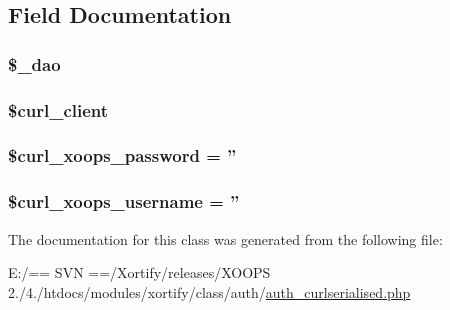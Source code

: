 \subsection{Field Documentation}
\hypertarget{class_xortify_auth_curlserialised_a12a029c610f699b4b25e79a1f64a3485}{
\subsubsection[{\$\-\_\-dao}]{\setlength{\rightskip}{0pt plus 5cm}\$\-\_\-dao}}\label{class_xortify_auth_curlserialised_a12a029c610f699b4b25e79a1f64a3485}
\hypertarget{class_xortify_auth_curlserialised_a402f2112991f3227835af80e9df33e38}{
\subsubsection[{\$curl\-\_\-client}]{\setlength{\rightskip}{0pt plus 5cm}\$curl\-\_\-client}}\label{class_xortify_auth_curlserialised_a402f2112991f3227835af80e9df33e38}
\hypertarget{class_xortify_auth_curlserialised_a6c9851541ed3826c67cfe7224c38f0b8}{
\subsubsection[{\$curl\-\_\-xoops\-\_\-password}]{\setlength{\rightskip}{0pt plus 5cm}\$curl\-\_\-xoops\-\_\-password = ''}}\label{class_xortify_auth_curlserialised_a6c9851541ed3826c67cfe7224c38f0b8}
\hypertarget{class_xortify_auth_curlserialised_aab7480ba9f878a02b2c9fd43922fa070}{
\subsubsection[{\$curl\-\_\-xoops\-\_\-username}]{\setlength{\rightskip}{0pt plus 5cm}\$curl\-\_\-xoops\-\_\-username = ''}}\label{class_xortify_auth_curlserialised_aab7480ba9f878a02b2c9fd43922fa070}


The documentation for this class was generated from the following file\-:\begin{DoxyCompactItemize}
\item 
E\-:/== S\-V\-N ==/\-Xortify/releases/\-X\-O\-O\-P\-S 2./4./htdocs/modules/xortify/class/auth/\hyperlink{auth__curlserialised_8php}{auth\-\_\-curlserialised.\-php}\end{DoxyCompactItemize}
